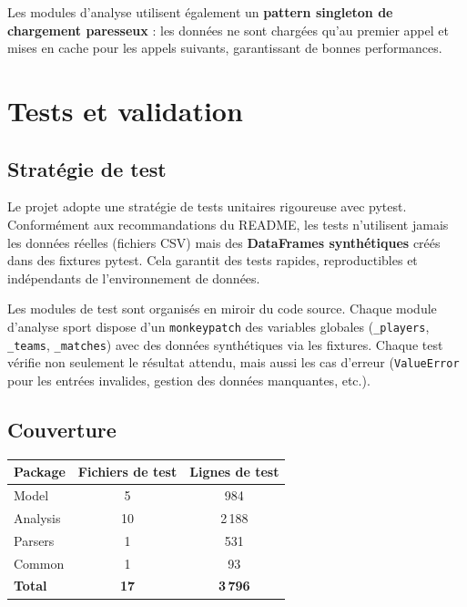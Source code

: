 \documentclass[12pt,a4paper]{article}
\newcommand{\code}[1]{\texttt{#1}}
\begin{document}
Les modules d'analyse utilisent également un \textbf{pattern singleton de chargement
paresseux} : les données ne sont chargées qu'au premier appel et mises en cache pour
les appels suivants, garantissant de bonnes performances.

\section{Tests et validation}
\label{sec:tests}

\subsection{Stratégie de test}

Le projet adopte une stratégie de tests unitaires rigoureuse avec pytest. Conformément
aux recommandations du README, les tests n'utilisent jamais les données réelles (fichiers
CSV) mais des \textbf{DataFrames synthétiques} créés dans des fixtures pytest. Cela
garantit des tests rapides, reproductibles et indépendants de l'environnement de données.

Les modules de test sont organisés en miroir du code source. Chaque module d'analyse
sport dispose d'un \code{monkeypatch} des variables globales (\code{\_players},
\code{\_teams}, \code{\_matches}) avec des données synthétiques via les fixtures.
Chaque test vérifie non seulement le résultat attendu, mais aussi les cas d'erreur
(\code{ValueError} pour les entrées invalides, gestion des données manquantes, etc.).

\subsection{Couverture}

\begin{center}
\begin{tabular}{lcc}
  \toprule
  \textbf{Package} & \textbf{Fichiers de test} & \textbf{Lignes de test} \\
  \midrule
  Model    & 5  & 984   \\
  Analysis & 10 & 2\,188 \\
  Parsers  & 1  & 531   \\
  Common   & 1  & 93    \\
  \midrule
  \textbf{Total} & \textbf{17} & \textbf{3\,796} \\
  \bottomrule
\end{tabular}
\end{center}
\end{document}
